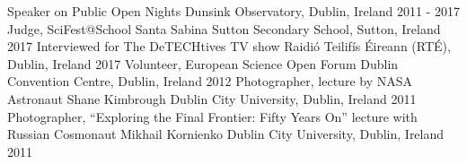 \begin{cvpress}
   \cvpres
   	{Speaker on Public Open Nights}
    {Dunsink Observatory, Dublin, Ireland}
    {2011 - 2017}
   \cvpres
   	{Judge, SciFest@School}
    {Santa Sabina Sutton Secondary School, Sutton, Ireland}
    {2017}
   \cvpres
   	{Interviewed for The DeTECHtives TV show}
    {Raidi{\'o} Teilif{\'i}s {\'E}ireann (RT{\'E}), Dublin, Ireland}
    {2017}
   \cvpres
   	{Volunteer, European Science Open Forum}
    {Dublin Convention Centre, Dublin, Ireland}
    {2012}
   \cvpres
   	{Photographer, lecture by NASA Astronaut Shane Kimbrough}
    {Dublin City University, Dublin, Ireland}
    {2011}
   \cvpres
   	{Photographer, ``Exploring the Final Frontier: Fifty Years On'' lecture with Russian Cosmonaut Mikhail Kornienko}
    {Dublin City University, Dublin, Ireland}
    {2011}
\end{cvpress}


